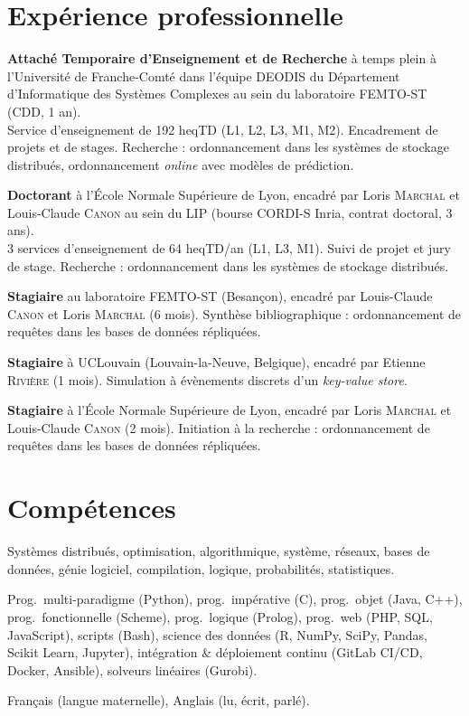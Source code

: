 \documentclass[12pt]{article}
\newcommand{\cvitem}[2]{\item[#1] #2}
\newcounter{cvitems}
\begin{document}
\section{Expérience professionnelle}

\begin{cvitems}
    \cvitem{2023--2024}{\textbf{Attaché Temporaire d'Enseignement et de Recherche} à temps plein à
    l'Université de Franche-Comté dans l'équipe DEODIS du Département d'Informatique des Systèmes
    Complexes au sein du laboratoire FEMTO-ST (CDD, 1 an). \\[4pt]
    Service d'enseignement de 192 heqTD (L1, L2, L3, M1, M2). Encadrement de projets et de stages.
    Recherche : ordonnancement dans les systèmes de stockage distribués, ordonnancement
    \emph{online} avec modèles de prédiction.}

    \cvitem{2020--2023}{\textbf{Doctorant} à l'École Normale Supérieure de Lyon, encadré par Loris
    \textsc{Marchal} et Louis-Claude \textsc{Canon} au sein du LIP (bourse CORDI-S Inria, contrat
    doctoral, 3 ans). \\[4pt]
    3 services d'enseignement de 64 heqTD/an (L1, L3, M1). Suivi de projet et jury de stage.
    Recherche : ordonnancement dans les systèmes de stockage distribués.}

    \cvitem{2020}{\textbf{Stagiaire} au laboratoire FEMTO-ST (Besançon), encadré par Louis-Claude
    \textsc{Canon} et Loris \textsc{Marchal} (6 mois).  
    Synthèse bibliographique : ordonnancement de requêtes dans les bases de données répliquées.}

    \cvitem{2019}{\textbf{Stagiaire} à UCLouvain (Louvain-la-Neuve, Belgique), encadré par Etienne
    \textsc{Rivière} (1 mois).  
    Simulation à évènements discrets d'un \emph{key-value store}.}

    \cvitem{2019}{\textbf{Stagiaire} à l'École Normale Supérieure de Lyon, encadré par Loris
    \textsc{Marchal} et Louis-Claude \textsc{Canon} (2 mois).  
    Initiation à la recherche : ordonnancement de requêtes dans les bases de données répliquées.}
\end{cvitems}

\section{Compétences}

\begin{cvitems}
    \cvitem{\bfseries Académiques}{Systèmes distribués, optimisation, algorithmique, système,
    réseaux, bases de données, génie logiciel, compilation, logique, probabilités, statistiques.}

    \cvitem{\bfseries Techniques}{Prog.\ multi-paradigme (Python), prog.\ impérative (C), prog.\
    objet (Java, C++), prog.\ fonctionnelle (Scheme), prog.\ logique (Prolog), prog.\ web (PHP, SQL,
    JavaScript), scripts (Bash), science des données (R, NumPy, SciPy, Pandas, Scikit Learn,
    Jupyter), intégration \& déploiement continu (GitLab CI/CD, Docker, Ansible), solveurs linéaires
    (Gurobi).}

    \cvitem{\bfseries Linguistiques}{Français (langue maternelle), Anglais (lu, écrit, parlé).}
\end{cvitems}
\end{document}
